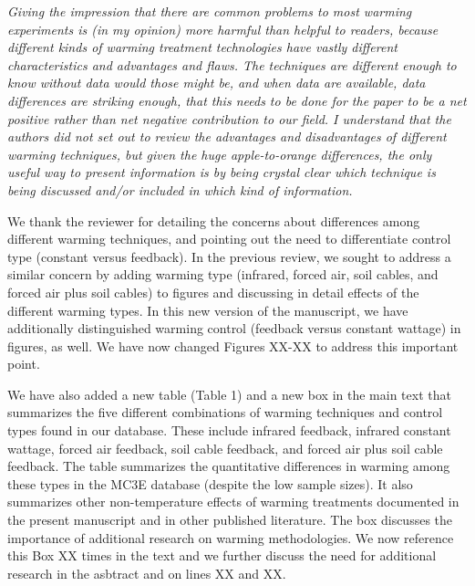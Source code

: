 \documentclass[11pt,a4paper]{letter}
\begin{document}
\begin{letter}{}
\begin{enumerate}
\begin{enumerate}
\par \emph{Giving the impression that there are common problems to most warming experiments is (in my opinion) more harmful than helpful to readers, because different kinds of warming treatment technologies have vastly different characteristics and advantages and flaws. The techniques are different enough to know without data would those might be, and when data are available, data differences are striking enough, that this needs to be done for the paper to be a net positive rather than net negative contribution to our field. I understand that the authors did not set out to review the advantages and disadvantages of different warming techniques, but given the huge apple-to-orange differences, the only useful way to present information is by being crystal clear which technique is being discussed and/or included in which kind of information.}

\par We thank the reviewer for detailing the concerns about differences among different warming techniques, and pointing out the need to differentiate control type (constant versus feedback). In the previous review, we sought to address a similar concern by adding warming type (infrared, forced air, soil cables, and forced air plus soil cables) to figures and discussing in detail effects of the different warming types. In this new version of the manuscript, we have additionally distinguished warming control (feedback versus constant wattage) in figures, as well. We have now changed Figures XX-XX to address this important point. %

\par We have also added a new table (Table 1) and a new box in the main text that summarizes the five different combinations of warming techniques and control types found in our database. These include infrared feedback, infrared constant wattage, forced air feedback, soil cable feedback, and forced air plus soil cable feedback. The table summarizes the quantitative differences in warming among these types in the MC3E database (despite the low sample sizes).  It also summarizes other non-temperature effects of warming treatments documented in the present manuscript and in other published literature. The box discusses the importance of additional research on warming methodologies. We now reference this Box XX times in the text and we further discuss the need for additional research in the asbtract and on lines XX and XX. %


\end{enumerate}
\end{enumerate}
\end{letter}
\end{document}
